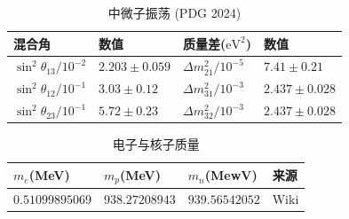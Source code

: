 				\begin{table}[H]
					\centering
					\caption{中微子振荡 (PDG 2024)}
					\begin{tabular}{p{2cm}|p{3cm}|p{3cm}|p{3cm}}
						\hline
						\hline
						混合角 & 数值 & 质量差($\text{eV}^2$) & 数值\\
						\hline
						$\sin^2 \theta_{13}/10^{-2}$ & $2.203\pm 0.059$ & $\Delta m_{21}^2/10^{-5}$ & $7.41\pm 0.21$\\
						\hline
						$\sin^2 \theta_{12}/10^{-1}$ & $3.03\pm 0.12$ & $\Delta m_{31}^2/10^{-3}$ & $2.437\pm 0.028$\\
						\hline
						$\sin^2 \theta_{23}/10^{-1}$ & $5.72\pm 0.23$ & $\Delta m_{32}^2/10^{-3}$ & $2.437\pm 0.028$\\
						\hline
						\hline
					\end{tabular}
					\label{Table: Oscillation Parameters}
				\end{table}
				\begin{table}[H]
					\centering
					\caption{电子与核子质量}
					\begin{tabular}{p{3cm}p{3cm}p{3cm}|p{3cm}}
						\hline
						\hline
						$m_e$(MeV) & $m_p$(MeV) & $m_n$(MewV) & 来源\\
						\hline
						$0.51099895069$ & $938.27208943$ & $939.56542052$ & Wiki\\
						\hline
						\hline
					\end{tabular}
					\label{Table: Electron and Nucleon Mass}
				\end{table}
